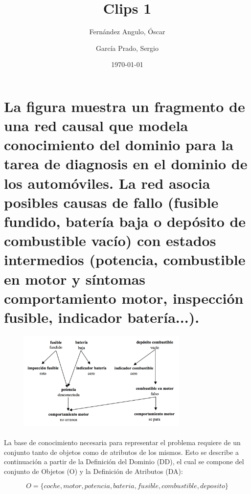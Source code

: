 \documentclass[10pt, a4paper,spanish]{article}
\title{\vspace{-15mm}\fontsize{24pt}{10pt}\selectfont\textbf{Clips 1}} %
\author{
	Fernández Angulo, Óscar \\
	\and
	García Prado, Sergio
}
\date{\today}
\begin{document}
	\maketitle %

	\thispagestyle{fancy} %





    \section{La figura muestra un fragmento de una red causal que modela conocimiento del dominio para la tarea de diagnosis en el dominio de los automóviles. La red asocia posibles causas de fallo (fusible fundido, batería baja o depósito de combustible vacío) con estados intermedios (potencia, combustible en motor y síntomas comportamiento motor, inspección fusible, indicador batería...).}

		\begin{figure}[H]
			\begin{center}
				\includegraphics[width=0.75\textwidth]{exercise-3-network}
			\end{center}
		\end{figure}

		\paragraph{}
		La base de conocimiento necesaria para representar el problema requiere de un conjunto tanto de objetos como de atributos de los mismos. Esto se describe a continuación a partir de la Definición del Dominio (DD), el cual se compone del conjunto de Objetos (O) y la Definición de Atributos (DA):

		\begin{equation*}
			O = \{coche, motor, potencia, bateria, fusible, combustible, deposito \}
		\end{equation*}
\end{document}
